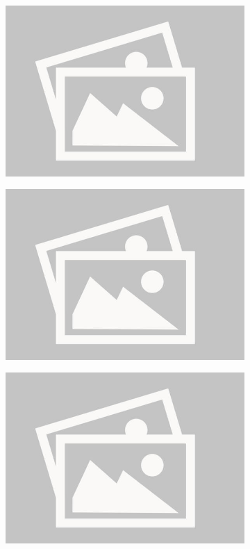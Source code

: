 \documentclass[a4paper,12pt]{report}
\begin{document}
\begin{figure}[H]
    \centering
    \begin{subfigure}{0.32\linewidth}
        \includegraphics[width=0.99\linewidth]{./photos/placeholder.jpg}
    \end{subfigure}
    \begin{subfigure}{0.32\linewidth}
        \includegraphics[width=0.99\linewidth]{./photos/placeholder.jpg}
    \end{subfigure}
    \begin{subfigure}{0.32\linewidth}
        \includegraphics[width=0.99\linewidth]{./photos/placeholder.jpg}

\end{subfigure}
\end{figure}
\end{document}
